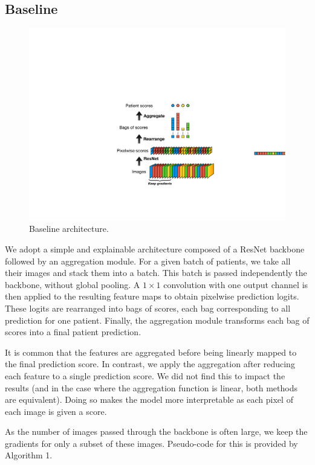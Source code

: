 \documentclass[final]{cvpr}
\begin{document}
	\subsection{Baseline}
	
	\begin{figure}[t]
		\begin{center}
			\includegraphics[width=0.9\linewidth]{graphic2.pdf}
		\end{center}
		\caption{Baseline architecture.}
		\label{fig:overview}
	\end{figure}

	We adopt a simple and explainable architecture composed of a ResNet \cite{resnet} backbone followed by an aggregation module.
	For a given batch of patients, we take all their images and stack them into a batch.
	This batch is passed independently the backbone, without global pooling. 
	A $1\times 1$ convolution with one output channel is then applied to the resulting feature maps to obtain pixelwise prediction logits.
	These logits are rearranged into bags of scores, each bag corresponding to all  prediction for one patient.
	Finally, the aggregation module transforms each bag of scores into a final patient prediction.
	
	It is common that the features are aggregated before being linearly mapped to the final prediction score.
	In contrast, we apply the aggregation after reducing each feature to a single prediction score. We did not find this to impact the results (and in the case where the aggregation function is linear, both methods are equivalent). Doing so makes the model more interpretable as each pixel of each image is given a score. 
	

	As the number of images passed through the backbone is often large, we keep the gradients for only a subset of these images. Pseudo-code for this is provided by Algorithm 1.
	
\end{document}
